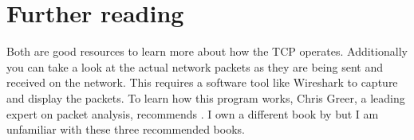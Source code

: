 \section{Further reading}
Both \textcite{stevens,comer} are good resources to learn more about how the \acf{TCP} operates.
Additionally you can take a look at the actual network packets as they are being sent and received on the network.
This requires a software tool like Wireshark to capture and display the packets.%
To learn how this program works, Chris Greer, a leading expert on packet analysis, recommends \textcite{chappell17,sanders,bock}.
I own a different book by \citeauthor{chappell17} but I am unfamiliar with these three recommended books.

